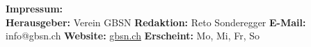 \small %
\textbf{Impressum:}\\
\textbf{Herausgeber:} Verein GBSN
\textbf{Redaktion:} Reto Sonderegger
\textbf{E-Mail:} info@gbsn.ch
\textbf{Website:} \href{http://gbsn.ch}{gbsn.ch}
\textbf{Erscheint:} Mo, Mi, Fr, So
